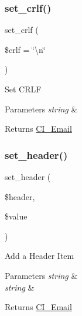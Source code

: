 \subsubsection{\texorpdfstring{set\+\_\+crlf()}{set\_crlf()}}
{\footnotesize\ttfamily set\+\_\+crlf (\begin{DoxyParamCaption}\item[{}]{\$crlf = {\ttfamily \char`\"{}\textbackslash{}n\char`\"{}} }\end{DoxyParamCaption})}

Set C\+R\+LF


\begin{DoxyParams}{Parameters}
{\em string} & \\
\hline
\end{DoxyParams}
\begin{DoxyReturn}{Returns}
\mbox{\hyperlink{class_c_i___email}{C\+I\+\_\+\+Email}} 
\end{DoxyReturn}
\mbox{\label{class_c_i___email_aff40701d50f18c87942be79f8b447247}} 
\subsubsection{\texorpdfstring{set\+\_\+header()}{set\_header()}}
{\footnotesize\ttfamily set\+\_\+header (\begin{DoxyParamCaption}\item[{}]{\$header,  }\item[{}]{\$value }\end{DoxyParamCaption})}

Add a Header Item


\begin{DoxyParams}{Parameters}
{\em string} & \\
\hline
{\em string} & \\
\hline
\end{DoxyParams}
\begin{DoxyReturn}{Returns}
\mbox{\hyperlink{class_c_i___email}{C\+I\+\_\+\+Email}} 
\end{DoxyReturn}
\mbox{\label{class_c_i___email_a9baeadff990ea673d75c3019c8cc3524}} 
